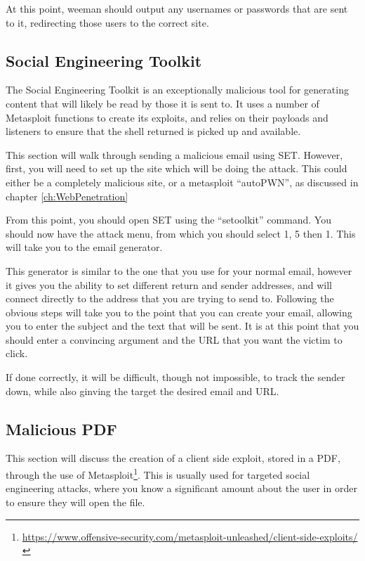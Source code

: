 			At this point, weeman should output any usernames or passwords that are sent to it, redirecting those users to the correct site. 
		\subsection{Social Engineering Toolkit}
			The Social Engineering Toolkit is an exceptionally malicious tool for generating content that will likely be read by those it is sent to. 
			It uses a number of Metasploit functions to create its exploits, and relies on their payloads and listeners to ensure that the shell returned is picked up and available. 

			This section will walk through sending a malicious email using SET. 
			However, first, you will need to set up the site which will be doing the attack. 
			This could either be a completely malicious site, or a metasploit ``autoPWN'', as discussed in chapter \ref{ch:WebPenetration}

			From this point, you should open SET using the ``setoolkit'' command. 
			You should now have the attack menu, from which you should select 1, 5 then 1. 
			This will take you to the email generator. 

			This generator is similar to the one that you use for your normal email, however it gives you the ability to set different return and sender addresses, and will connect directly to the address that you are trying to send to. 
			Following the obvious steps will take you to the point that you can create your email, 
			allowing you to enter the subject and the text that will be sent. 
			It is at this point that you should enter a convincing argument and the URL that you want the victim to click. 

			If done correctly, it will be difficult, though not impossible, to track the sender down, while also ginving the target the desired email and URL. 

		\subsection{Malicious PDF}
			This section will discuss the creation of a client side exploit, stored in a PDF, through the use of Metasploit\footnote{\url{https://www.offensive-security.com/metasploit-unleashed/client-side-exploits/}}.
			This is usually used for targeted social engineering attacks, where you know a significant amount about the user in order to ensure they will open the file\cite{MSFU}. 

